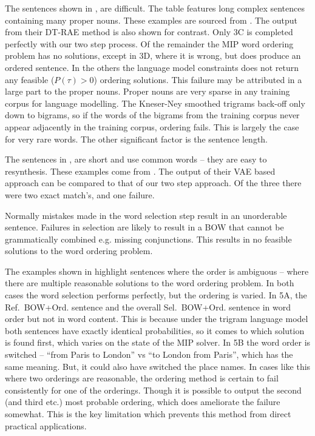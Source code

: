 \documentclass[compsoc]{IEEEtran}
\theoremstyle{plain}
\theoremstyle{definition}
\newcommand{\oracletitle}{Ref.~BOW+Ord.}
\newcommand{\twosteptitle}{Sel.~BOW+Ord.}
\begin{document}
The sentences shown in , are difficult. The table features long complex sentences containing many proper nouns. These examples are sourced from \textcite{iyyer2014generating}. The output from their DT-RAE method is also shown for contrast. Only 3C is completed perfectly with our two step process. Of the remainder the MIP word ordering problem has no solutions, except in 3D, where it is wrong, but does produce an ordered sentence. In the others the language model constraints does not return any feasible ($P(\tau)>0$) ordering solutions. This failure may be attributed in a large part to the proper nouns.  Proper nouns are very sparse in any training corpus for language modelling. The Kneser-Ney smoothed trigrams back-off only down to bigrams, so if the words of the bigrams from the training corpus never appear adjacently in the training corpus, ordering fails. This is largely the case for very rare words. The other significant factor is the sentence length.

The sentences in , are short and use common words -- they are easy to resynthesis. These examples come from \textcite{Bowman2015SmoothGeneration}. The output of their VAE based approach can be compared to that of our two step approach. Of the three there were two exact match's, and one failure.

Normally mistakes made in the word selection step result in an unorderable sentence. Failures in selection are likely to result in a BOW that cannot be grammatically combined e.g. missing conjunctions. This results in no feasible solutions to the word ordering problem.

The examples shown in  highlight sentences where the order is ambiguous -- where there are multiple reasonable solutions to the word ordering problem. In both cases the word selection performs perfectly, but the ordering is varied. In 5A, the \oracletitle{} sentence and the overall \twosteptitle{} sentence  in word order but not in word content. This is because under the trigram language model both sentences have exactly identical probabilities, so it comes to which solution is found first, which varies on the state of the MIP solver. In 5B the word order is switched -- ``from Paris to London'' vs ``to London from Paris'', which has the same meaning. But, it could also have switched the place names. In cases like this where two orderings are reasonable, the ordering method is certain to fail consistently for one of the orderings. Though it is possible to output the second (and third etc.) most probable ordering, which does ameliorate the failure somewhat. This is the key limitation which prevents this method from direct practical applications.
\end{document}
